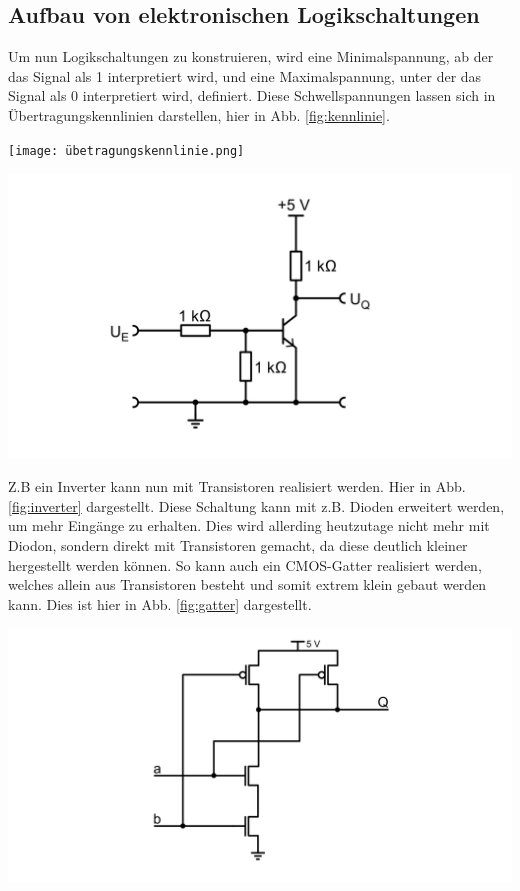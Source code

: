 \documentclass[10pt]{article}
\newenvironment{Figure}
  {\par\medskip\noindent\minipage{\linewidth}}
  {\endminipage\par\medskip}
\begin{document}
\begin{multicols}{2}
	\subsection{Aufbau von elektronischen Logikschaltungen}
	Um nun Logikschaltungen zu konstruieren, wird eine Minimalspannung, ab der das Signal als 1 interpretiert wird, und eine Maximalspannung, unter der das Signal als 0 interpretiert wird, definiert. Diese Schwellspannungen lassen sich in Übertragungskennlinien darstellen, hier in Abb. \ref{fig:kennlinie}.
	\begin{Figure}
		\centering
		\texttt{[image: übetragungskennlinie.png]}
		\label{fig:kennlinie}
	\end{Figure}
	\begin{Figure}
		\centering
		\includegraphics[width=1\textwidth]{inverter.png}
		\label{fig:inverter}
	\end{Figure}
	Z.B ein Inverter kann nun mit Transistoren realisiert werden. Hier in Abb. \ref{fig:inverter} dargestellt. Diese Schaltung kann mit z.B. Dioden erweitert werden, um mehr Eingänge zu erhalten. Dies wird allerding heutzutage nicht mehr mit Diodon, sondern direkt mit Transistoren gemacht, da diese deutlich kleiner hergestellt werden können. So kann auch ein CMOS-Gatter realisiert werden, welches allein aus Transistoren besteht und somit extrem klein gebaut werden kann. Dies ist hier in Abb. \ref{fig:gatter} dargestellt.
	\begin{Figure}
		\centering
		\includegraphics[width=1\textwidth]{cmos-gatter.png}
		\label{fig:gatter}
	\end{Figure}

\end{multicols}
\end{document}
